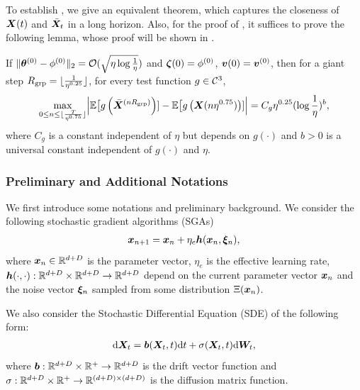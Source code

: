 To establish , we give an equivalent theorem, which captures the closeness of ${\bm{X}}(t)$ and $\bar{{\bm{X}}}_t$ in a long horizon. Also, for the proof of , it suffices to prove the following lemma, whose proof will be shown in .
\begin{theorem}\label{thm:formal-SDE-approximation}
    If $\|{\bm{\theta}}^{(0)}-\phi^{(0)}\|_2 = \mathcal{O}(\sqrt{\eta\log \frac{1}{\eta}})$ and ${\bm{\zeta}}(0) = \phi^{(0)}$, ${\bm{v}}(0)={\bm{v}}^{(0)}$, then for a giant step $R_{\mathrm{grp}} = \lfloor \frac{1}{\eta^{0.25}}\rfloor$, for every test function $g\in\mathcal{C}^{3}$,
    \begin{align*}
            \max_{0\le n \le \lfloor\frac{T}{\eta^{0.75}}\rfloor}
            \Bigl|\mathbb{E}\bigl[g\left(\bar{{\bm{X}}}^{(n R_{\mathrm{grp}})}\right)]
            -\mathbb{E}\bigl[g\left({\bm{X}}(n\eta^{0.75})\right)]\Bigr|
            =C_g\eta^{0.25}(\log\frac{1}{\eta})^b,
    \end{align*}
    where $C_g$ is a constant independent of $\eta$ but depends on $g(\cdot)$ and $b > 0$ is a universal constant independent of $g(\cdot)$ and $\eta$.
\end{theorem}

\subsubsection{Preliminary and Additional Notations}
We first introduce some notations and preliminary background. We consider the following stochastic gradient algorithms (SGAs)
\begin{align*}
    {\bm{x}}_{n+1} = {\bm{x}}_{n} + \eta_e {\bm{h}}({\bm{x}}_n,{\bm{\xi}}_n),
\end{align*}
where ${\bm{x}}_n\in \mathbb{R}^{d+D}$ is the parameter vector, $\eta_e$ is the effective learning rate, ${\bm{h}}(\cdot,\cdot):\mathbb{R}^{d+D}\times \mathbb{R}^{d+D} \to \mathbb{R}^{d+D}$ depend on the current parameter vector ${\bm{x}}_n$ and the noise vector ${\bm{\xi}}_n$ sampled from some distribution $\Xi({\bm{x}}_n)$.

We also consider the Stochastic Differential Equation (SDE) of the following form:
\begin{align*}
    \mathrm{d} {\bm{X}}_t = {\bm{b}}({\bm{X}}_t,t)\mathrm{d} t + \mathbf{\sigma}({\bm{X}}_t,t)\mathrm{d} {\bm{W}}_t,
\end{align*}
where ${\bm{b}}:\mathbb{R}^{d+D} \times \mathbb{R}^{+} \to \mathbb{R}^{d+D}$ is the drift vector function and $\mathbf{\sigma}:\mathbb{R}^{d+D} \times \mathbb{R}^{+} \to \mathbb{R}^{(d+D) \times (d+D)}$ is the diffusion matrix function.

